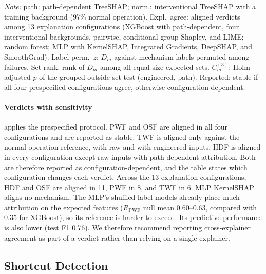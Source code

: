 \documentclass[conference]{IEEEtran}
\begin{document}
\begin{table}[t]
\centering
\begin{threeparttable}
\caption{AI4I verdicts reported with their prespecified sensitivity set (\cref{sec:protocol}).}
\label{tab:sensitivity}
\footnotesize
\setlength{\tabcolsep}{2.2pt}

\begin{tablenotes}[flushleft]
\footnotesize
\item \textit{Note:} path: path-dependent TreeSHAP; norm.: interventional TreeSHAP with a training background (97\% normal operation). Expl.\ agree: aligned verdicts among 13 explanation configurations (XGBoost with path-dependent, four interventional backgrounds, pairwise, conditional group Shapley, and LIME; random forest; MLP with KernelSHAP, Integrated Gradients, DeepSHAP, and SmoothGrad). Label perm.\ $z$: $D_m$ against mechanism labels permuted among failures. Set rank: rank of $D_m$ among all equal-size expected sets. $C^{(3)}_m$: Holm-adjusted $p$ of the grouped outside-set test (engineered, path). Reported: stable if all four prespecified configurations agree, otherwise configuration-dependent.
\end{tablenotes}
\end{threeparttable}
\end{table}

\paragraph{Verdicts with sensitivity}
 applies the prespecified protocol. PWF and OSF are aligned in all four configurations and are reported as stable. TWF is aligned only against the normal-operation reference, with raw and with engineered inputs. HDF is aligned in every configuration except raw inputs with path-dependent attribution. Both are therefore reported as configuration-dependent, and the table states which configuration changes each verdict. Across the 13 explanation configurations, HDF and OSF are aligned in 11, PWF in 8, and TWF in 6. MLP KernelSHAP aligns no mechanism. The MLP's shuffled-label models already place much attribution on the expected features ($R_{\mathrm{PWF}}$ null mean 0.60--0.63, compared with 0.35 for XGBoost), so its reference is harder to exceed. Its predictive performance is also lower (test F1 0.76). We therefore recommend reporting cross-explainer agreement as part of a verdict rather than relying on a single explainer.


\subsection{Shortcut Detection}
\label{sec:sweep}
\end{document}
